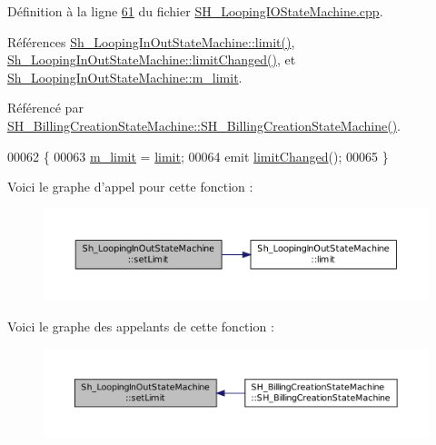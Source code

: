 Définition à la ligne \hyperlink{SH__LoopingIOStateMachine_8cpp_source_l00061}{61} du fichier \hyperlink{SH__LoopingIOStateMachine_8cpp_source}{S\-H\-\_\-\-Looping\-I\-O\-State\-Machine.\-cpp}.



Références \hyperlink{classSh__LoopingInOutStateMachine_ac44b7158256f09b878c8958cf3ae3bf8}{Sh\-\_\-\-Looping\-In\-Out\-State\-Machine\-::limit()}, \hyperlink{classSh__LoopingInOutStateMachine_a5b65ad7a49294022ff781c71c4702157}{Sh\-\_\-\-Looping\-In\-Out\-State\-Machine\-::limit\-Changed()}, et \hyperlink{classSh__LoopingInOutStateMachine_a320ece6cf74c2667c70059b9421117fb}{Sh\-\_\-\-Looping\-In\-Out\-State\-Machine\-::m\-\_\-limit}.



Référencé par \hyperlink{classSH__BillingCreationStateMachine_ad62b77fa4aeafe200056ff3974562f83}{S\-H\-\_\-\-Billing\-Creation\-State\-Machine\-::\-S\-H\-\_\-\-Billing\-Creation\-State\-Machine()}.


\begin{DoxyCode}
00062 \{
00063     \hyperlink{classSh__LoopingInOutStateMachine_a320ece6cf74c2667c70059b9421117fb}{m\_limit} = \hyperlink{classSh__LoopingInOutStateMachine_ac44b7158256f09b878c8958cf3ae3bf8}{limit};
00064     emit \hyperlink{classSh__LoopingInOutStateMachine_a5b65ad7a49294022ff781c71c4702157}{limitChanged}();
00065 \}
\end{DoxyCode}


Voici le graphe d'appel pour cette fonction \-:
\nopagebreak
\begin{figure}[H]
\begin{center}
\leavevmode
\includegraphics[width=350pt]{classSh__LoopingInOutStateMachine_ab5e9ac94cbd9a47a45dcb50e777c398b_cgraph}
\end{center}
\end{figure}




Voici le graphe des appelants de cette fonction \-:
\nopagebreak
\begin{figure}[H]
\begin{center}
\leavevmode
\includegraphics[width=350pt]{classSh__LoopingInOutStateMachine_ab5e9ac94cbd9a47a45dcb50e777c398b_icgraph}
\end{center}
\end{figure}


